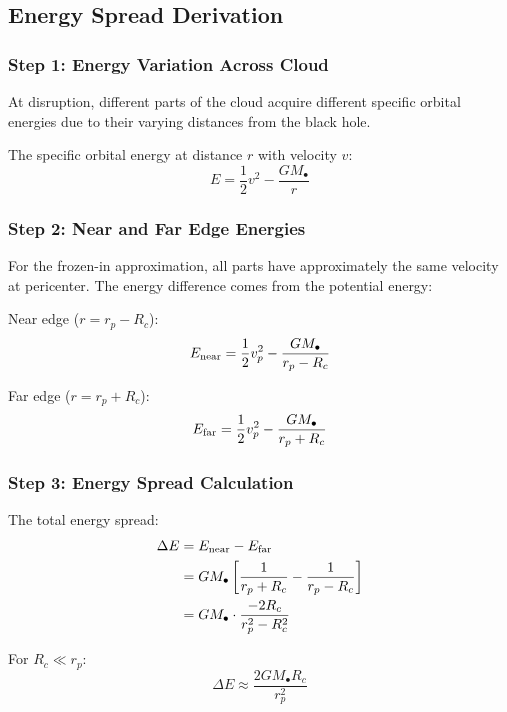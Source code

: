 \documentclass[twocolumn,amsmath,amssymb,prd,superscriptaddress,nofootinbib]{revtex4-2}
\begin{document}
\subsection{Energy Spread Derivation}
\label{sec:energy_spread}

\subsubsection{Step 1: Energy Variation Across Cloud}

At disruption, different parts of the cloud acquire different specific orbital energies due to their varying distances from the black hole.

The specific orbital energy at distance $r$ with velocity $v$:
\begin{equation}
    E = \frac{1}{2}v^2 - \frac{GM_\bullet}{r}
\end{equation}

\subsubsection{Step 2: Near and Far Edge Energies}

For the frozen-in approximation, all parts have approximately the same velocity at pericenter. The energy difference comes from the potential energy:

Near edge ($r = r_p - R_c$):
\begin{equation}
    E_{\rm near} = \frac{1}{2}v_p^2 - \frac{GM_\bullet}{r_p - R_c}
\end{equation}

Far edge ($r = r_p + R_c$):
\begin{equation}
    E_{\rm far} = \frac{1}{2}v_p^2 - \frac{GM_\bullet}{r_p + R_c}
\end{equation}

\subsubsection{Step 3: Energy Spread Calculation}

The total energy spread:
\begin{align}
    \Delta E &= E_{\rm near} - E_{\rm far} \\
    &= GM_\bullet\left[\frac{1}{r_p + R_c} - \frac{1}{r_p - R_c}\right] \\
    &= GM_\bullet \cdot \frac{-2R_c}{r_p^2 - R_c^2}
\end{align}

For $R_c \ll r_p$:
\begin{equation}
    \boxed{\Delta E \approx \frac{2GM_\bullet R_c}{r_p^2}}
    \label{eq:delta_E}
\end{equation}
\end{document}
